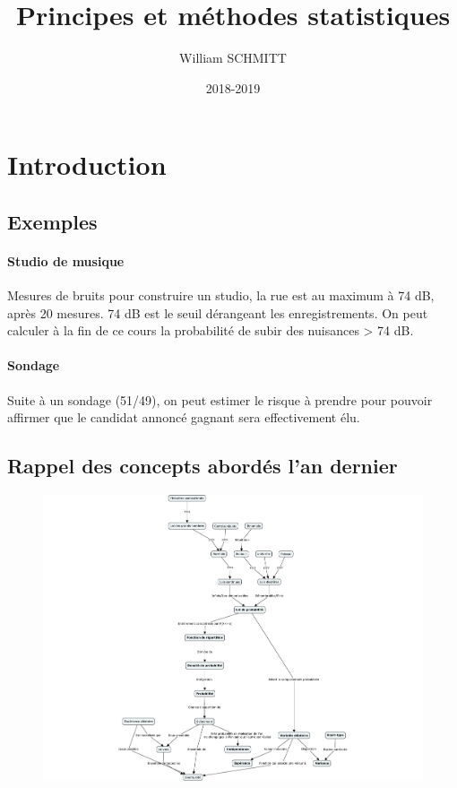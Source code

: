 \documentclass[11pt]{article}
\title{Principes et méthodes statistiques}
\author{William SCHMITT}
\date{2018-2019}
\begin{document}
\maketitle

\tableofcontents

\section{Introduction}

\subsection{Exemples}
\paragraph{Studio de musique} Mesures de bruits pour construire un studio, la
rue est au maximum à 74 dB, après 20 mesures. 74 dB est le seuil dérangeant 
les enregistrements. On peut calculer à la fin de ce cours la probabilité 
de subir des nuisances > 74 dB.

\paragraph{Sondage} Suite à un sondage (51/49), on peut estimer le risque à 
prendre pour pouvoir affirmer que le candidat annoncé gagnant sera effectivement
élu.

\subsection{Rappel des concepts abordés l'an dernier}
\begin{figure}
    \includegraphics[scale=.65]{img/mindmap-1AA-probas.pdf}    
\end{figure}
\end{document}
